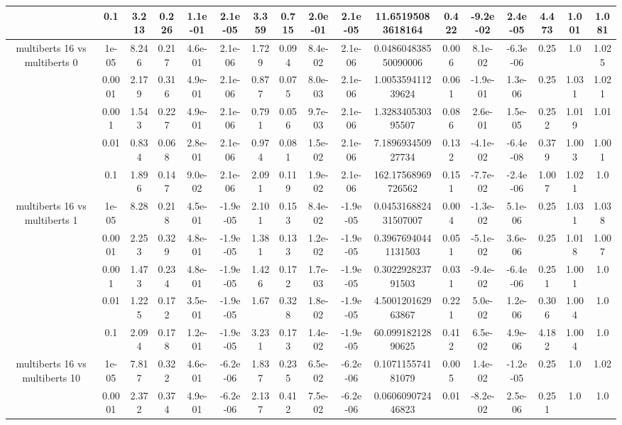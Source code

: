 \begin{tabular}{|c|c|c|c|c|c|c|c|c|c|c|c|c|c|c|c|c|}
 & 0.1 & 3.213 & 0.226 & 1.1e-01 & 2.1e-05 & 3.359 & 0.715 & 2.0e-01 & 2.1e-05 & 11.65195083618164 & 0.422 & -9.2e-02 & 2.4e-05 & 4.473 & 1.001 & 1.081 \\
\hline
\multirow{5}{*}{multiberts 16 vs multiberts 0} & 1e-05 & 8.246 & 0.217 & 4.6e-01 & 2.1e-06 & 1.729 & 0.094 & 8.4e-02 & 2.1e-06 & 0.048604838550090006 & 0.006 & 8.1e-02 & -6.3e-06 & 0.25 & 1.0 & 1.025 \\
 & 0.0001 & 2.179 & 0.316 & 4.9e-01 & 2.1e-06 & 0.877 & 0.075 & 8.0e-03 & 2.1e-06 & 1.005359411239624 & 0.061 & -1.9e-01 & 1.3e-06 & 0.25 & 1.031 & 1.021 \\
 & 0.001 & 1.543 & 0.227 & 4.9e-01 & 2.1e-06 & 0.791 & 0.056 & 9.7e-03 & 2.1e-06 & 1.328340530395507 & 0.086 & 2.6e-01 & 1.5e-05 & 0.252 & 1.019 & 1.01 \\
 & 0.01 & 0.834 & 0.068 & 2.8e-01 & 2.1e-06 & 0.974 & 0.081 & 1.5e-02 & 2.1e-06 & 7.189693450927734 & 0.132 & -4.1e-02 & -6.4e-08 & 0.379 & 1.003 & 1.001 \\
 & 0.1 & 1.896 & 0.147 & 9.0e-02 & 2.1e-06 & 2.091 & 0.119 & 1.9e-02 & 2.1e-06 & 162.17568969726562 & 0.151 & -7.7e-02 & -2.4e-06 & 1.007 & 1.021 & 1.0 \\
\hline
\multirow{5}{*}{multiberts 16 vs multiberts 1} & 1e-05 & 8.28 & 0.218 & 4.5e-01 & -1.9e-05 & 2.101 & 0.153 & 8.4e-02 & -1.9e-05 & 0.045316882431507007 & 0.004 & -1.3e-02 & 5.1e-06 & 0.25 & 1.031 & 1.038 \\
 & 0.0001 & 2.253 & 0.329 & 4.8e-01 & -1.9e-05 & 1.381 & 0.133 & 1.2e-02 & -1.9e-05 & 0.39676940441131503 & 0.051 & -5.1e-02 & 3.6e-06 & 0.25 & 1.018 & 1.007 \\
 & 0.001 & 1.473 & 0.234 & 4.8e-01 & -1.9e-05 & 1.426 & 0.172 & 1.7e-03 & -1.9e-05 & 0.302292823791503 & 0.031 & -9.4e-02 & -6.4e-06 & 0.251 & 1.001 & 1.0 \\
 & 0.01 & 1.225 & 0.172 & 3.5e-01 & -1.9e-05 & 1.67 & 0.328 & 1.8e-02 & -1.9e-05 & 4.500120162963867 & 0.221 & 5.0e-02 & 1.2e-06 & 0.306 & 1.004 & 1.0 \\
 & 0.1 & 2.094 & 0.178 & 1.2e-01 & -1.9e-05 & 3.231 & 0.173 & 1.4e-02 & -1.9e-05 & 60.09918212890625 & 0.412 & 6.5e-02 & 4.9e-06 & 4.182 & 1.004 & 1.0 \\
\hline
\multirow{5}{*}{multiberts 16 vs multiberts 10} & 1e-05 & 7.817 & 0.322 & 4.6e-01 & -6.2e-06 & 1.837 & 0.235 & 6.5e-02 & -6.2e-06 & 0.107115574181079 & 0.005 & 1.4e-02 & -1.2e-05 & 0.25 & 1.0 & 1.02 \\
 & 0.0001 & 2.372 & 0.374 & 4.9e-01 & -6.2e-06 & 2.137 & 0.412 & 7.5e-02 & -6.2e-06 & 0.060609072446823 & 0.01 & -8.2e-02 & 2.5e-06 & 0.251 & 1.0 & 1.0 \\

\end{tabular}
